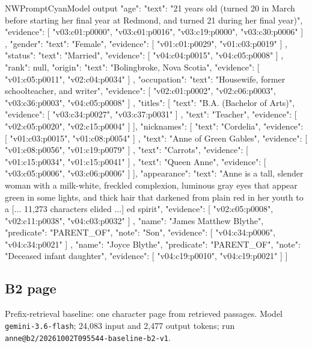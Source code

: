\begin{nwprompt}{NWPromptCyan}{Model output}
{
  "age": {
    "text": "21 years old (turned 20 in March before starting her final year at Redmond, and turned 21 during her final year)",
    "evidence": [
      "v03:c01:p0000",
      "v03:c01:p0016",
      "v03:c19:p0000",
      "v03:c30:p0006"
    ]
  },
  "gender": {
    "text": "Female",
    "evidence": [
      "v01:c01:p0029",
      "v01:c03:p0019"
    ]
  },
  "status": {
    "text": "Married",
    "evidence": [
      "v04:c04:p0015",
      "v04:c05:p0008"
    ]
  },
  "rank": null,
  "origin": {
    "text": "Bolingbroke, Nova Scotia",
    "evidence": [
      "v01:c05:p0011",
      "v02:c04:p0034"
    ]
  },
  "occupation": {
    "text": "Housewife, former schoolteacher, and writer",
    "evidence": [
      "v02:c01:p0002",
      "v02:c06:p0003",
      "v03:c36:p0003",
      "v04:c05:p0008"
    ]
  },
  "titles": [
    {
      "text": "B.A. (Bachelor of Arts)",
      "evidence": [
        "v03:c34:p0027",
        "v03:c37:p0031"
      ]
    },
    {
      "text": "Teacher",
      "evidence": [
        "v02:c05:p0020",
        "v02:c15:p0004"
      ]
    }
  ],
  "nicknames": [
    {
      "text": "Cordelia",
      "evidence": [
        "v01:c03:p0015",
        "v01:c08:p0054"
      ]
    },
    {
      "text": "Anne of Green Gables",
      "evidence": [
        "v01:c08:p0056",
        "v01:c19:p0079"
      ]
    },
    {
      "text": "Carrots",
      "evidence": [
        "v01:c15:p0034",
        "v01:c15:p0041"
      ]
    },
    {
      "text": "Queen Anne",
      "evidence": [
        "v03:c05:p0006",
        "v03:c06:p0006"
      ]
    }
  ],
  "appearance": {
    "text": "Anne is a tall, slender woman with a milk-white, freckled complexion, luminous gray eyes that appear green in some lights, and thick hair that darkened from plain red in her youth to a
[... 11,273 characters elided ...]
ed spirit",
      "evidence": [
        "v02:c05:p0008",
        "v02:c11:p0038",
        "v04:c03:p0032"
      ]
    },
    {
      "name": "James Matthew Blythe",
      "predicate": "PARENT_OF",
      "note": "Son",
      "evidence": [
        "v04:c34:p0006",
        "v04:c34:p0021"
      ]
    },
    {
      "name": "Joyce Blythe",
      "predicate": "PARENT_OF",
      "note": "Deceased infant daughter",
      "evidence": [
        "v04:c19:p0010",
        "v04:c19:p0021"
      ]
    }
  ]
}
\end{nwprompt}

\subsection*{B2 page}
Prefix-retrieval baseline: one character page from retrieved passages. Model \texttt{gemini-3.6-flash}; 24,083 input and 2,477 output tokens; run \nolinkurl{anne@b2/20261002T095544-baseline-b2-v1}.

